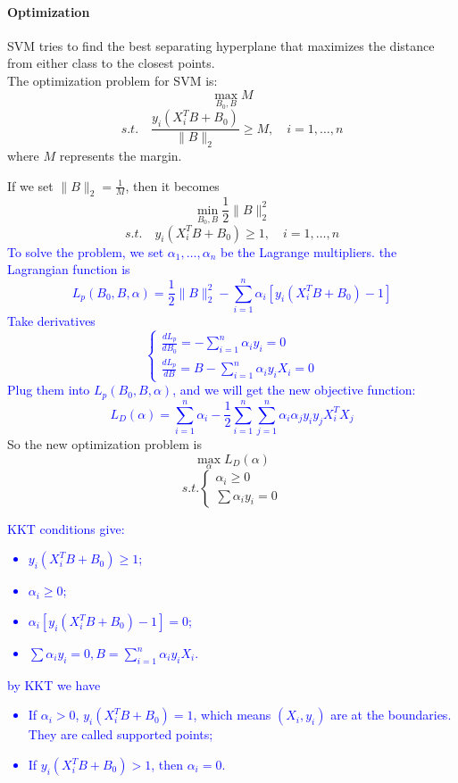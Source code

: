 \documentclass[12pt]{book}
\theoremstyle{definition}
\theoremstyle{remark}
\begin{document}
\paragraph{Optimization}
SVM tries to find the best separating hyperplane that maximizes the distance from either class to the closest points.\\
The optimization problem for SVM is:
\[\max_{B_0,B}M\]
\[s.t. \quad \frac{y_i(X_i^TB+B_0)}{\|B\|_2}\ge M, \quad i=1,\dots, n\]
where $M$ represents the margin.

If we set $\|B\|_2 = \frac1M$, then it becomes 
\[\min_{B_0,B} \frac12\|B\|_2^2\]
\[s.t. \quad y_i(X_i^TB+B_0)\ge 1, \quad i=1,\dots, n\]
\textcolor{blue}{
To solve the problem, we set $\alpha_1, \dots, \alpha_n$ be the Lagrange multipliers. the Lagrangian function is 
\[L_p(B_0, B, \alpha) = \frac12 \|B\|_2^2 - \sum_{i=1}^n \alpha_i [y_i(X_i^TB+B_0)-1]\]
Take derivatives 
\[\begin{cases}
    \frac{d L_p}{dB_0} = -\sum_{i=1}^n \alpha_i y_i = 0\\
    \frac{d L_p}{dB} = B -\sum_{i=1}^n \alpha_i y_iX_i = 0
\end{cases}\]
Plug them into $L_p(B_0, B, \alpha)$, and we will get the new objective function:
\[L_D(\alpha) = \sum_{i=1}^n \alpha_i - \frac12 \sum_{i=1}^n\sum_{j=1}^n\alpha_i\alpha_jy_iy_jX_i^TX_j\]}
So the new optimization problem is 
\[\max_{\alpha}L_D(\alpha)\]
\[s.t. \begin{cases}
    \alpha_i \ge 0\\
    \sum \alpha_iy_i = 0
\end{cases}\]

\textcolor{blue}{
KKT conditions give:
\begin{itemize}
    \item $y_i(X_i^TB+B_0)\ge 1$;
    \item $\alpha_i \ge 0$;
    \item $\alpha_i[y_i(X_i^TB+B_0)-1] = 0$;
    \item $\sum \alpha_iy_i = 0, B = \sum_{i=1}^n \alpha_i y_iX_i$.
\end{itemize}
by KKT we have
\begin{itemize}
    \item If $\alpha_i > 0 $, $y_i(X_i^TB+B_0)=1$, which means $(X_i, y_i)$ are at the boundaries. They are called supported points;
    \item If $y_i(X_i^TB+B_0)>1$, then $\alpha_i = 0$.
\end{itemize}
}
\end{document}
